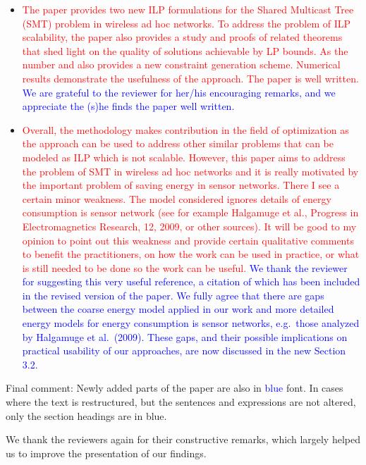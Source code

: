 \documentclass[12pt]{article}
\begin{document}
\begin{itemize}
\item \textcolor{red}{The paper provides two new ILP formulations for the Shared Multicast Tree (SMT) problem in wireless ad hoc networks.
To address the problem of ILP scalability, the paper also provides a study and proofs of related theorems that shed light on the quality of
solutions achievable by  LP  bounds.
As the number and also provides a new constraint generation scheme.
Numerical results demonstrate the usefulness of the approach. The paper is well written.} \textcolor{blue}{
We are grateful to the reviewer for her/his encouraging remarks, and we appreciate the (s)he finds the paper well written.
}
\item \textcolor{red}{Overall, the methodology makes contribution in the field of optimization as the approach can be used to address other similar problems
that can be modeled as ILP which is not scalable.
However, this paper aims to address the problem of SMT in wireless ad hoc networks and it is
really motivated by the important problem of saving energy in sensor networks.
There I see a certain minor weakness.
The model considered ignores details of energy consumption is sensor network
(see for example Halgamuge et al., Progress in Electromagnetics Research, 12, 2009, or other sources).
It will be good to my opinion to point out this weakness and provide certain qualitative comments to benefit the practitioners,
on how the work can be used in practice, or what is still needed to be done so the work can be useful.} \textcolor{blue}{
We thank the reviewer for suggesting this very useful reference, a citation of which has been included in the revised version of the paper.
We fully agree that there are gaps between the coarse energy model applied in our work and more detailed energy models for energy consumption is sensor networks,
e.g.\ those analyzed by Halgamuge et al.\ (2009).
These gaps, and their possible implications on practical usability of our approaches, are now discussed in the new Section 3.2.
}
\end{itemize}

\noindent
Final comment: 
Newly added parts of the paper are also in \textcolor{blue}{blue} font.
In cases where the text is restructured, but the sentences and expressions are not altered, only the section headings are in blue.

We thank the reviewers again for their constructive remarks, which largely helped us to improve the presentation of our findings.
\end{document}
